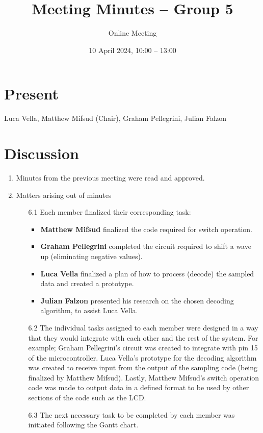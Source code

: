 \documentclass{cce2014-meetings}
\title{Meeting Minutes -- Group 5}
\author{Online Meeting}
\date{10 April 2024, 10:00 -- 13:00}
\begin{document}
\maketitle

\section*{Present}
Luca Vella,
Matthew Mifsud (Chair),
Graham Pellegrini,
Julian Falzon

\section*{Discussion}

\begin{enumerate}


\item Minutes from the previous meeting were read and approved.

\item Matters arising out of minutes
   \begin{enumerate}
   \item [6.1] Each member finalized their corresponding task:
      \begin{itemize}
         \item \textbf{Matthew Mifsud} finalized the code required for switch operation.
         \item \textbf{Graham Pellegrini} completed the circuit required to shift a wave up (eliminating negative values).
         \item \textbf{Luca Vella} finalized a plan of how to process (decode) the sampled data and created a prototype.
         \item \textbf{Julian Falzon} presented his research on the chosen decoding algorithm, to assist Luca Vella.
      \end{itemize}
   \item [6.2] The individual tasks assigned to each member were designed in a way that they would integrate with each other and the rest of the system. For example; Graham Pellegrini's circuit was created to integrate with pin 15 of the microcontroller. Luca Vella's prototype for the decoding algorithm was created to receive input from the output of the sampling code (being finalized by Matthew Mifsud). Lastly, Matthew Mifsud's switch operation code was made to output data in a defined format to be used by other sections of the code such as the LCD.
   \item [6.3] The next necessary task to be completed by each member was initiated following the Gantt chart.
   \end{enumerate}


\end{enumerate}
\end{document}
